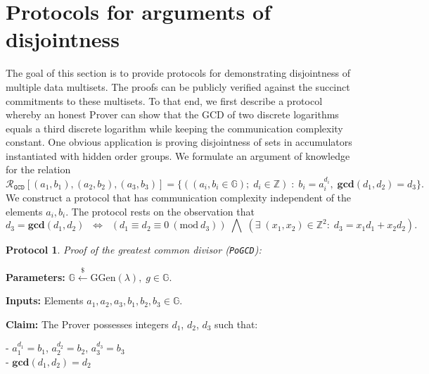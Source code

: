 \documentclass[11pt, lettersize, notitlepage, leqno, footskip=0.6cm]{article}
\newcommand{\bz}{\mathbb Z}
\newcommand{\ttt}{\texttt}
\newcommand{\LRA}{\Longleftrightarrow}
\newcommand{\mc}{\mathcal}
\newcommand{\mb}{\mathbb}
\newcommand{\mbf}{\mathbf}
\newcommand{\mr}{\mathrm}
\newcommand{\lamb}{\lambda}
\newcommand{\vs}{\vspace{-0.15cm}}
\newcommand{\Mod}[1]{\ (\mathrm{mod}\ #1)}
\newcommand{\GCD}{\mbf{gcd}}
\newtheorem{Prot}[Thm]{Protocol}
\numberwithin{equation}{section}
\begin{document}
\section{\fontsize{12}{12}\selectfont Protocols for arguments of disjointness}

The goal of this section is to provide protocols for demonstrating disjointness of multiple data multisets. The proofs can be publicly verified against the succinct commitments to these multisets. To that end, we first describe a protocol whereby an honest Prover can show that the GCD of two discrete logarithms equals a third discrete logarithm while keeping the communication complexity constant. One obvious application is proving disjointness of sets in accumulators instantiated with hidden order groups. We formulate an argument of knowledge for the relation  $$\mc{R}_{{\ttt{GCD}}}[(a_1,b_1),(a_2,b_2),(a_3,b_3)] = \{((a_i, b_i\in\mb{G});\;d_i\in\bz)\;:\; b_i = a_i^{d_i},\;\GCD(d_1,d_2)=d_3  \} .$$ We construct a protocol that has communication complexity independent of the elements $a_i, b_i$. The protocol rests on the observation that \vs $$d_3 = \GCD(d_1, d_2)\;\; \LRA \;\;(d_1\equiv d_2\equiv 0 \Mod{d_3})\;\bigwedge \; \left(\exists \; (x_1,x_2)\in \bz^2:\; d_3 = x_1d_1+x_2d_2  \right).$$
 

\begin{Prot} \normalfont \textit{Proof of the greatest common divisor} (\verb|PoGCD|):\end{Prot} \vspace{-0.3cm}

\noindent \textbf{Parameters:} $\mb{G}\xleftarrow{\$} \mr{GGen}(\lamb), \; g\in \mb{G}$.

\noindent \textbf{Inputs:} Elements $a_1, a_2, a_3, b_1, b_2, b_3 \in \mb{G}$.

\noindent \textbf{Claim:} The Prover possesses integers $d_1$, $d_2$, $d_3$ such that:

\noindent - $a_1^{d_1} = b_1$, $a_2^{d_2} = b_2$, $a_3^{d_3} = b_3$\\
\noindent - $\GCD(d_1, d_2) = d_2$
 
\end{document}
